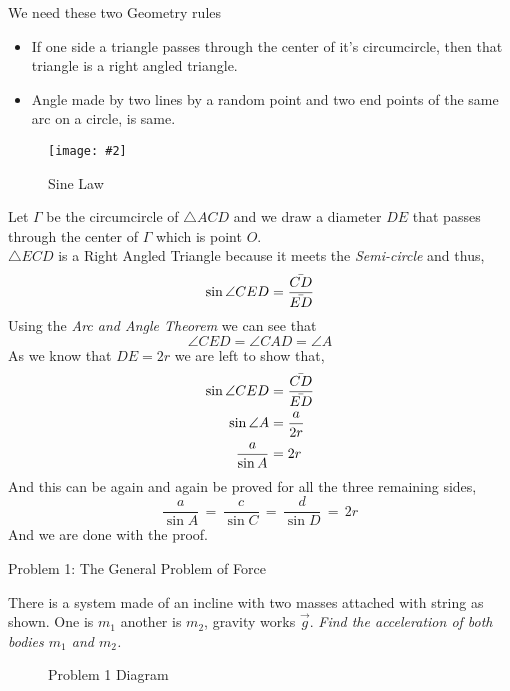\documentclass[9pt,serif]{beamer}
\newenvironment{myitemize}{\begin{itemize}}{\end{itemize}}
\newcommand{\prob}[1]{ \begin{problem.} #1 \end{problem.}}
\newcommand{\fig}[3]{ \begin{figure} \centering \texttt{[image: \#2]} \caption{#3}  \end{figure}}
\newcommand{\draw}[3]{ \begin{figure}[hbt!] \centering
 \fontsize{35pt}{20pt}\selectfont \resizebox{#1 \textwidth}{!}{
{#2.pdf_tex}}\caption{#3} \label{#3} \end{figure} }
\begin{document}
\begin{frame}
    {We need these two Geometry rules}
    \begin{myitemize}
    \item If one side a triangle passes through the center of it's circumcircle, then that triangle is a right angled triangle. 
    \item Angle made by two lines by a random point and two end points of the same arc on a circle, is same. 
    \end{myitemize}
    
\end{frame}


\begin{frame}
\fig{0.8}{sinelawpic.png}{Sine Law}
\end{frame}



\begin{frame}
 Let $\Gamma$ be the circumcircle of $\triangle ACD$ and we draw a diameter $DE$ that passes through the center of $\Gamma$ which is point $O$. \\
 $\triangle ECD$ is a Right Angled Triangle because it meets the \emph{Semi-circle} and thus,
 \[ \sin \angle CED = \frac{\Bar{CD}}{\Bar{ED}}\]
 Using the \emph{Arc and Angle Theorem} we can see that  
 \[ \angle CED = \angle CAD = \angle A \]
 As we know that $DE = 2r$ we are left to show that,
 \begin{align}
 \sin \angle CED &=  \frac{\Bar{CD}}{\Bar{ED}} \notag \\
 \sin \angle A & = \frac{a}{2r} \\
 \frac{a}{\sin A} & = 2r
 \end{align}
 And this can be again and again be proved for all the three remaining sides,
 \begin{equation}
 \frac{a}{\sin A} \,=\, \frac{c}{\sin C} \,=\, \frac{d}{\sin D} \, = \, 2r
 \end{equation}
 And we are done with the proof.
\end{frame}



\begin{frame}{Problem 1: The General Problem of Force}

    \prob{There is a system made of an incline with two masses attached with
    string as shown. One is $m_1 $ another is $ m_2$, gravity works $\vec{g}$.
\emph{Find the acceleration of both bodies  $m_1$ and $m_2$. }}  
    
    \draw{0.6}{prob1-1}{Problem 1 Diagram} 

\end{frame}
\end{document}
